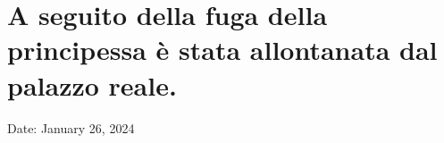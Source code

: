\section{A seguito della fuga della principessa è stata allontanata dal
palazzo
reale.}\label{a-seguito-della-fuga-della-principessa-uxe8-stata-allontanata-dal-palazzo-reale.}

Date: January 26, 2024

